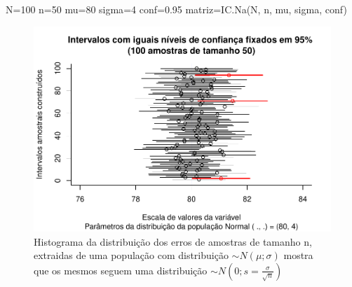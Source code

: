 \documentclass[
]{book}
\newenvironment{Shaded}{\begin{snugshade}}{\end{snugshade}}
\newcommand{\DecValTok}[1]{\textcolor[rgb]{0.00,0.00,0.81}{#1}}
\newcommand{\FloatTok}[1]{\textcolor[rgb]{0.00,0.00,0.81}{#1}}
\newcommand{\FunctionTok}[1]{\textcolor[rgb]{0.00,0.00,0.00}{#1}}
\newcommand{\NormalTok}[1]{#1}
\newcommand{\OtherTok}[1]{\textcolor[rgb]{0.56,0.35,0.01}{#1}}
\begin{document}
\hfill\break

\hfill\break

\begin{Shaded}
\begin{Highlighting}[]
\NormalTok{N}\OtherTok{=}\DecValTok{100}
\NormalTok{n}\OtherTok{=}\DecValTok{50}
\NormalTok{mu}\OtherTok{=}\DecValTok{80}
\NormalTok{sigma}\OtherTok{=}\DecValTok{4} 
\NormalTok{conf}\OtherTok{=}\FloatTok{0.95}
\NormalTok{matriz}\OtherTok{=}\FunctionTok{IC.Na}\NormalTok{(N, n, mu, sigma, conf)}
\end{Highlighting}
\end{Shaded}

\begin{figure}

{\centering \includegraphics[width=1\linewidth]{apostila_files/figure-latex/fig0-1} 

}

\caption{Histograma da distribuição dos erros de amostras de tamanho n,  extraidas de uma população com distribuição $\sim N(\mu; \sigma)$ mostra que os mesmos seguem uma distribuição $\sim N (0; s=\frac{\sigma}{\sqrt{n}})$}\label{fig:fig0-1}
\end{figure}
\end{document}
